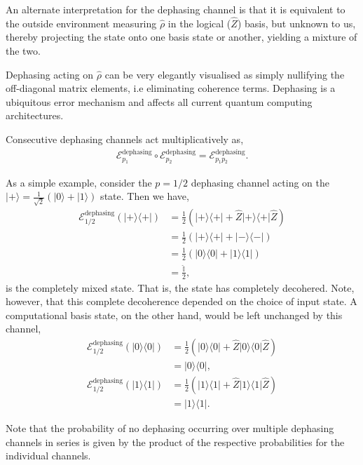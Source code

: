 \documentclass[aps,rmp,twocolumn,amsmath,amssymb,nofootinbib,superscriptaddress,longbibliography,floatfix,table-of-contents,eqsecnum]{revtex4-1}
\newcommand{\bra}[1]{\langle#1|}
\newcommand{\ket}[1]{|#1\rangle}
\begin{document}
An alternate interpretation for the dephasing channel is that it is equivalent to the outside environment measuring $\hat\rho$ in the logical ($\hat{Z}$) basis, but unknown to us, thereby projecting the state onto one basis state or another, yielding a mixture of the two.

Dephasing acting on $\hat\rho$ can be very elegantly visualised as simply nullifying the off-diagonal matrix elements, i.e eliminating coherence terms. Dephasing is a ubiquitous error mechanism and affects all current quantum computing architectures.

Consecutive dephasing channels act multiplicatively as,
\begin{align} \label{eq:multi_deph}
\mathcal{E}_{p_1}^\text{dephasing} \circ \mathcal{E}_{p_2}^\text{dephasing} = \mathcal{E}_{p_1 p_2}^\text{dephasing}.
\end{align}

As a simple example, consider the \mbox{$p=1/2$} dephasing channel acting on the \mbox{$\ket{+} = \frac{1}{\sqrt{2}}(\ket{0}+\ket{1})$} state. Then we have,
\begin{align}
\mathcal{E}^\text{dephasing}_{1/2}(\ket{+}\bra{+}) &= \frac{1}{2} (\ket{+}\bra{+} + \hat{Z}\ket{+}\bra{+}\hat{Z}) \nonumber \\
&= \frac{1}{2} (\ket{+}\bra{+} + \ket{-}\bra{-}) \nonumber \\
&= \frac{1}{2} (\ket{0}\bra{0} + \ket{1}\bra{1}) \nonumber \\
&= \frac{\mathbb{\hat{I}}}{2},
\end{align}
is the completely mixed state. That is, the state has completely decohered. Note, however, that this complete decoherence depended on the choice of input state. A computational basis state, on the other hand, would be left unchanged by this channel,
\begin{align}
\mathcal{E}^\text{dephasing}_{1/2}(\ket{0}\bra{0}) &= \frac{1}{2} (\ket{0}\bra{0} + \hat{Z}\ket{0}\bra{0}\hat{Z}) \nonumber \\
&= \ket{0}\bra{0}, \nonumber \\
\mathcal{E}^\text{dephasing}_{1/2}(\ket{1}\bra{1}) &= \frac{1}{2} (\ket{1}\bra{1} + \hat{Z}\ket{1}\bra{1}\hat{Z}) \nonumber \\
&= \ket{1}\bra{1}.
\end{align}

Note that the probability of no dephasing occurring over multiple dephasing channels in series is given by the product of the respective probabilities for the individual channels.
\end{document}
